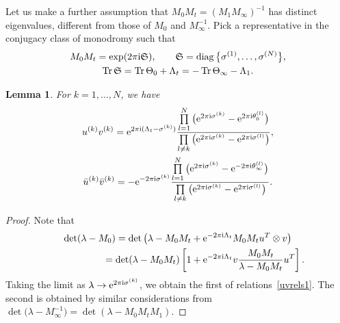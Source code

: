 \documentclass[pdftex]{sigma}
\numberwithin{equation}{section}
\newtheorem{Lemma}[Theorem]{Lemma}
\begin{document}
Let us make a further assumption that $M_0M_t=( M_1 M_{\infty})^{-1} $ has distinct eigenvalues, different from those of $M_0$ and $M_{\infty}^{-1}$. Pick a representative in the conjugacy class of monodromy such that
\begin{gather}
M_0M_t=\exp(2\pi{\rm i}\mathfrak S), \qquad \mathfrak S=\operatorname{diag}\big\{\sigma^{(1)},\ldots,\sigma^{(N)}\big\},\nonumber\\
\operatorname{Tr}\mathfrak S=\operatorname{Tr}\Theta_0+\Lambda_t=-\operatorname{Tr}\Theta_{\infty}-\Lambda_1.\label{M0Mt}
\end{gather}
\begin{Lemma}\label{lem31} For $k=1,\ldots,N$, we have
\begin{subequations}\label{uvrels1}
\begin{gather}\label{uvrels1a}
u^{(k)}v^{(k)}= {\rm e}^{2\pi{\rm i}(\Lambda_t-\sigma^{(k)})}\frac{\prod\limits_{l=1}^N\big({\rm e}^{2\pi{\rm i} \sigma^{(k)}}-{\rm e}^{2\pi{\rm i} \theta_0^{(l)}}\big)}{\prod\limits_{l\ne k}\big({\rm e}^{2\pi{\rm i} \sigma^{(k)}}-{\rm e}^{2\pi{\rm i} \sigma^{(l)}}\big)},\\
\label{uvrels1b}\bar u^{(k)}\bar v^{(k)}= -{\rm e}^{-2\pi{\rm i} \sigma^{(k)}}\frac{\prod\limits_{l=1}^N\big({\rm e}^{2\pi{\rm i} \sigma^{(k)}}-{\rm e}^{-2\pi{\rm i} \theta^{(l)}_{\infty}}\big)}{\prod\limits_{l\ne k}\big({\rm e}^{2\pi{\rm i} \sigma^{(k)}}-{\rm e}^{2\pi{\rm i} \sigma^{(l)}}\big)}.
\end{gather}
\end{subequations}
\end{Lemma}
\begin{proof}Note that
\begin{gather*}
\det ( \lambda-M_0)=\det \big(\lambda-M_0 M_t+{\rm e}^{-2\pi{\rm i}\Lambda_t} M_0 M_t u^{T}\otimes v\big)\nonumber\\
\hphantom{\det ( \lambda-M_0)}{}=
\det (\lambda-M_0 M_t)\left[1+{\rm e}^{-2\pi{\rm i} \Lambda_t}v\frac{M_0M_t}{\lambda - M_0M_t}u^T\right].
\end{gather*}
Taking the limit as $\lambda\to {\rm e}^{2\pi{\rm i}\sigma^{(k)}}$, we obtain the first of relations~\eqref{uvrels1}. The second is obtained by similar considerations from $\det \big( \lambda-M_{\infty}^{-1}\big)=\det (\lambda-M_0M_tM_1)$.
\end{proof}
\end{document}
